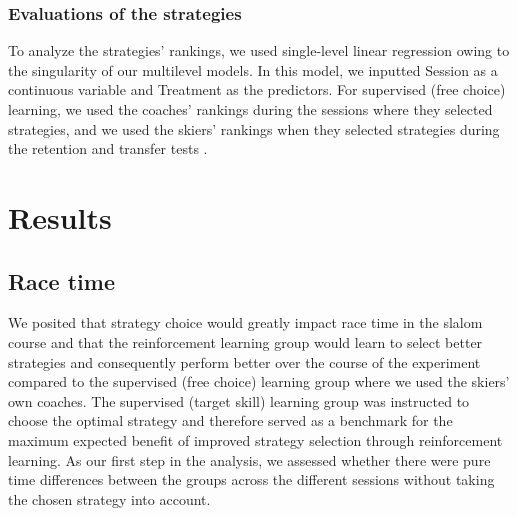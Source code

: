\documentclass[pdflatex,sn-mathphys-num]{sn-jnl}%
\theoremstyle{thmstyleone}%
\theoremstyle{thmstyletwo}%
\theoremstyle{thmstylethree}%
\begin{document}
\subsubsection{Evaluations of the strategies}
To analyze the strategies' rankings, we used single-level linear regression owing to the singularity of our multilevel models. In this model, we inputted Session as a continuous variable and Treatment as the predictors. For supervised (free choice) learning, we used the coaches' rankings during the sessions where they selected strategies, and we used the skiers' rankings when they selected strategies during the retention and transfer tests .



\section{Results}


\subsection{Race time}\label{result_racetime}
We posited that strategy choice would greatly impact race time in the slalom course and that the reinforcement learning group would learn to select better strategies and consequently perform better over the course of the experiment compared to the supervised (free choice) learning group where we used the skiers' own coaches. The supervised (target skill) learning group was instructed to choose the optimal strategy and therefore served as a benchmark for the maximum expected benefit of improved strategy selection through reinforcement learning. As our first step in the analysis, we assessed whether there were pure time differences between the groups across the different sessions without taking the chosen strategy into account. 
\end{document}
